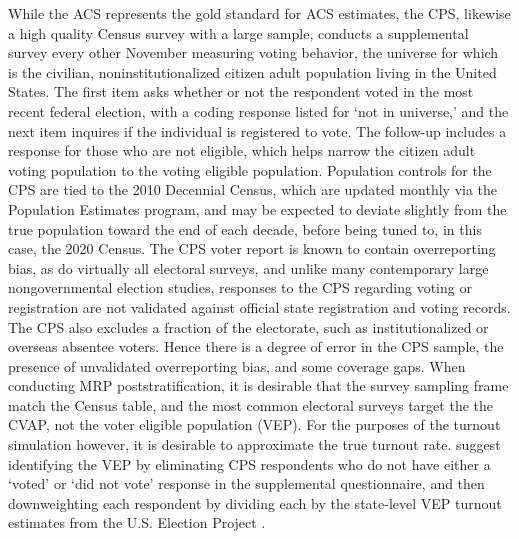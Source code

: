 While the ACS represents the gold standard for ACS estimates, the CPS, likewise a high quality Census survey with a large sample, conducts a supplemental survey every other November measuring voting behavior, the universe for which is the civilian, noninstitutionalized citizen adult population living in the United States. The first item asks whether or not the respondent voted in the most recent federal election, with a coding response listed for `not in universe,' and the next item inquires if the individual is registered to vote. The follow-up includes a response for those who are not eligible, which helps narrow the citizen adult voting population to the voting eligible population. Population controls for the CPS are tied to the 2010 Decennial Census, which are updated monthly via the Population Estimates program, and may be expected to deviate slightly from the true population toward the end of each decade, before being tuned to, in this case, the 2020 Census. The CPS voter report is known to contain overreporting bias, as do virtually all electoral surveys, and unlike many contemporary large nongovernmental election studies, responses to the CPS regarding voting or registration are not validated against official state registration and voting records. The CPS also excludes a fraction of the electorate, such as institutionalized or overseas absentee voters. Hence there is a degree of error in the CPS sample, the presence of unvalidated overreporting bias, and some coverage gaps. When conducting MRP poststratification, it is desirable that the survey sampling frame match the Census table, and the most common electoral surveys target the the CVAP, not the voter eligible population (VEP). For the purposes of the turnout simulation however, it is desirable to approximate the true turnout rate. \citet{hur_coding_2013} suggest identifying the VEP by eliminating CPS respondents who do not have either a `voted' or `did not vote' response in the supplemental questionnaire, and then downweighting each respondent by dividing each by the state-level VEP turnout estimates from the U.S. Election Project \citep{mcdonald_united_2021}. 


% 

